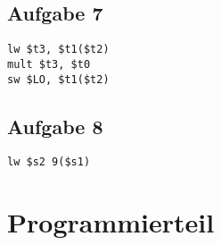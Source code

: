 \documentclass[a4paper,abstracton]{scrartcl}
\begin{document}
\subsection{Aufgabe 7}
\begin{lstlisting}[caption=Assembler]
lw $t3, $t1($t2)
mult $t3, $t0
sw $LO, $t1($t2)
\end{lstlisting}

\subsection{Aufgabe 8}
\begin{lstlisting}[caption=Laden in Register]
lw $s2 9($s1)
\end{lstlisting}

\newpage

\section{Programmierteil}

\newpage

\end{document}
